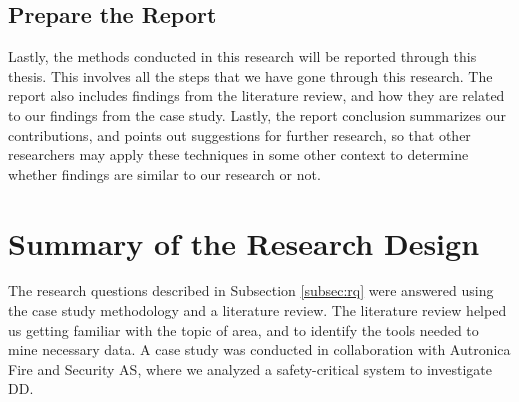 \subsection{Prepare the Report}
Lastly, the methods conducted in this research will be reported through this thesis. This involves all the steps that we have gone through this research. The report also includes findings from the literature review, and how they are related to our findings from the case study. Lastly, the report conclusion summarizes our contributions, and points out suggestions for further research, so that other researchers may apply these techniques in some other context to determine whether findings are similar to our research or not.


\section{Summary of the Research Design}
The research questions described in Subsection \ref{subsec:rq} were answered using the case study methodology and a literature review. The literature review helped us getting familiar with the topic of area, and to identify the tools needed to mine necessary data. A case study was conducted in collaboration with Autronica Fire and Security AS, where we analyzed a safety-critical system to investigate DD.

\cleardoublepage























